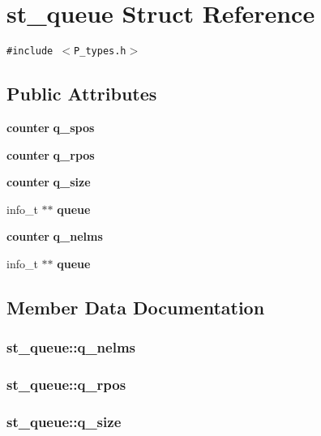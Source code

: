 \section{st\_\-queue  Struct Reference}
\label{structst__queue}
{\tt \#include $<$P\_\-types.h$>$}

\subsection*{Public Attributes}
\begin{CompactItemize}
\item 
{\bf counter} {\bf q\_\-spos}
\item 
{\bf counter} {\bf q\_\-rpos}
\item 
{\bf counter} {\bf q\_\-size}
\item 
info\_\-t $\ast$$\ast$ {\bf queue}
\item 
{\bf counter} {\bf q\_\-nelms}
\item 
info\_\-t $\ast$$\ast$ {\bf queue}
\end{CompactItemize}


\subsection{Member Data Documentation}
\subsubsection{ st\_\-queue::q\_\-nelms}\label{structst__queue_m4}


\subsubsection{ st\_\-queue::q\_\-rpos}\label{structst__queue_m1}


\subsubsection{ st\_\-queue::q\_\-size}\label{structst__queue_m2}



